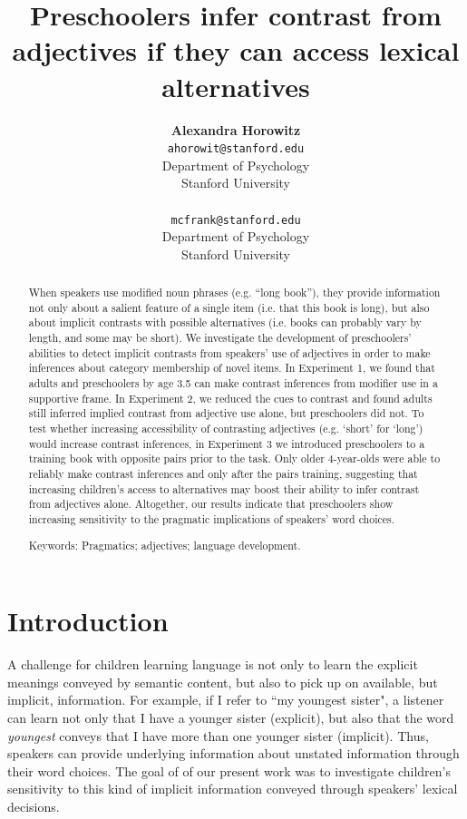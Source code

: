 \documentclass[10pt,letterpaper]{article}
\title{Preschoolers infer contrast from adjectives if they can access lexical alternatives}
\author{{\large \bf Alexandra Horowitz} \\ \texttt{ahorowit@stanford.edu}\\ Department of Psychology \\ Stanford University \\ 
\And {\large \bf Michael C. Frank} \\ \texttt{mcfrank@stanford.edu} \\ Department of Psychology \\ Stanford University \\ }
\begin{document}
\maketitle

\begin{abstract} 

When speakers use modified noun phrases (e.g. ``long book''), they provide information not only about a salient feature of a single item (i.e. that this book is long), but also about implicit contrasts with possible alternatives (i.e. books can probably vary by length, and some may be short).  We investigate the development of preschoolers' abilities to detect implicit contrasts from speakers' use of adjectives in order to make inferences about category membership of novel items.  In Experiment 1, we found that adults and preschoolers by age 3.5 can make contrast inferences from modifier use in a supportive frame.  In Experiment 2, we reduced the cues to contrast and found adults still inferred implied contrast from adjective use alone, but preschoolers did not.  To test whether increasing accessibility of contrasting adjectives (e.g. `short' for `long') would increase contrast inferences, in Experiment 3 we introduced preschoolers to a training book with opposite pairs prior to the task.  Only older 4-year-olds were able to reliably make contrast inferences and only after the pairs training, suggesting that increasing children's access to alternatives may boost their ability to infer contrast from adjectives alone.  Altogether, our results indicate that preschoolers show increasing sensitivity to the pragmatic implications of speakers' word choices. 

{Keywords:} Pragmatics; adjectives; language development. 
\end{abstract}

\section{Introduction}

A challenge for children learning language is not only to learn the explicit meanings conveyed by semantic content, but also to pick up on available, but implicit, information.  For example, if I refer to ``my youngest sister", a listener can learn not only that I have a younger sister (explicit), but also that the word \emph{youngest} conveys that I have more than one younger sister (implicit).  Thus, speakers can provide underlying information about unstated information through their word choices.  The goal of of our present work was to investigate children's sensitivity to this kind of implicit information conveyed through speakers' lexical decisions. 
\end{document}
